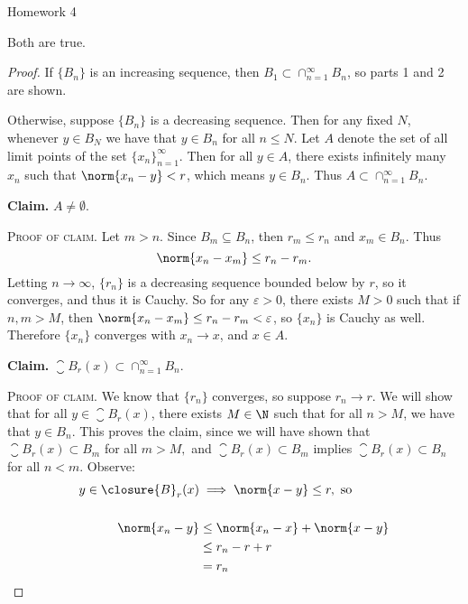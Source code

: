 \documentclass[12pt,letterpaper]{article}
\renewcommand{\epsilon}{\varepsilon}
\begin{document}
\pagestyle{fancy}
\begin{center}
{\Large Homework 4}%
\end{center}


\answer Both are true. 

\begin{proof}
If $\{B_n\}$ is an increasing sequence, then $B_1\subset \cap_{n=1}^{\infty} B_n$, so parts 1 and 2 are shown. 

Otherwise, suppose $\{B_n\}$ is a decreasing sequence. Then for any fixed $N$, whenever $y\in B_N$ we have that $y\in B_n$ for all $n\leq N$. Let $A$ denote the set of all limit points of the set $\{x_n\}_{n=1}^\infty$. Then for all $y\in A$, there exists infinitely many $x_n$ such that $\norm{x_n - y}<r$, which means $y\in B_n$. Thus $A\subset \cap_{n=1}^{\infty} B_n$. 

\textbf{Claim.} $A\neq\emptyset$. 

\textsc{Proof of claim.} Let $m>n$. Since $B_m\subseteq B_n$, then $r_m\leq r_n$ and $x_m\in B_n$. Thus 
\[\norm{x_n-x_m}\leq r_n-r_m.\]
Letting $n\to\infty$, $\{r_n\}$ is a decreasing sequence bounded below by $r$, so it converges, and thus it is Cauchy. So for any $\epsilon>0$, there exists $M>0$ such that if $n,m>M$, then $\norm{x_n-x_m}\leq r_n-r_m<\epsilon$, so $\{x_n\}$ is Cauchy as well. Therefore $\{x_n\}$ converges with $x_n \to x$, and $x\in A$. 

\textbf{Claim.} $\closure{B}_r(x)\subset \cap_{n=1}^\infty B_n$. 

\textsc{Proof of claim.} We know that $\{r_n\}$ converges, so \Wlog{} suppose $r_n\to r$. We will show that for all $y\in \closure{B}_r(x)$, there exists $M\in \N$ such that for all $n>M$, we have that $y\in B_n$. This proves the claim, since we will have shown that $\closure{B}_r(x)\subset B_m $ for all $m>M,$ and $\closure{B}_r(x)\subset B_m$ implies $\closure{B}_r(x)\subset B_n$ for all $n<m$. Observe:
\begin{align*}
y\in \closure{B}_r(x) &\implies \norm{x-y}\leq r , \text{ so}\\
\\
\norm{x_n-y}&\leq \norm{x_n-x} + \norm{x-y} \\
&\leq r_n-r+r \\
&=r_n
\end{align*}
\end{proof}

\pagebreak
{}
\end{document}
